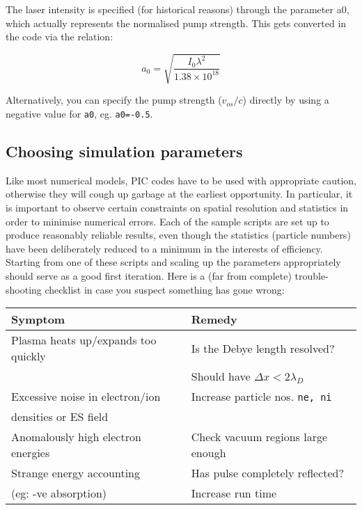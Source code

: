 \documentclass[11pt]{article}
\newcommand{\voc}{$v_{os}/c$}
\begin{document}
The laser intensity is specified (for historical reasons) through the parameter a0, which actually represents the 
normalised pump strength. This gets converted in the code via the relation: 

 $$ a_0 = \sqrt{\frac{ I_0\lambda^2}{1.38\times 10^{18}} } $$

Alternatively, you can specify the pump strength (\voc ) directly by using a negative value for \texttt{a0}, eg. \texttt{a0=-0.5}. 

\subsection{Choosing simulation parameters}
Like most numerical models, PIC codes have to be used with appropriate caution, otherwise they will cough up garbage 
at the earliest opportunity. In particular, it is important to observe certain constraints on spatial
resolution and statistics in order to minimise numerical errors. Each of the sample scripts are set up to produce
 reasonably reliable results, even though the statistics (particle numbers) have been deliberately reduced to a
minimum in the interests of efficiency.  Starting from one of these scripts and scaling up the parameters appropriately should
serve as a good first iteration.  Here is a (far from complete) trouble-shooting checklist in case you suspect something has gone wrong: 
\medskip\\
\begin{tabular}{ll}
Symptom & Remedy \\ \hline
Plasma heats up/expands too quickly & Is the Debye length resolved?  \\
& Should have $\Delta x < 2\lambda_D$  \\ \hline
Excessive noise in electron/ion & Increase particle nos. \texttt{ne, ni} \\
densities or ES field & \\ \hline 
Anomalously high electron energies & Check vacuum regions large enough \\ \hline
Strange energy accounting & Has pulse completely reflected?  \\
 (eg: -ve absorption) & Increase run time \\ \hline
\end{tabular}

\bigskip
\end{document}
